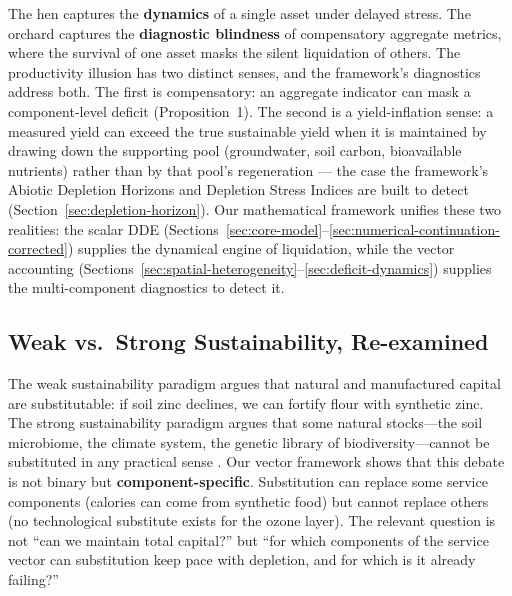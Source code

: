 \documentclass[twocolumn,10pt]{article}
\begin{document}
The hen captures the \textbf{dynamics} of a single asset under delayed stress. The orchard captures the \textbf{diagnostic blindness} of compensatory aggregate metrics, where the survival of one asset masks the silent liquidation of others. The productivity illusion has two distinct senses, and the framework's diagnostics address both. The first is compensatory: an aggregate indicator can mask a component-level deficit (Proposition~1). The second is a yield-inflation sense: a measured yield can exceed the true sustainable yield when it is maintained by drawing down the supporting pool (groundwater, soil carbon, bioavailable nutrients) rather than by that pool's regeneration --- the case the framework's Abiotic Depletion Horizons and Depletion Stress Indices are built to detect (Section~\ref{sec:depletion-horizon}). Our mathematical framework unifies these two realities: the scalar DDE (Sections~\ref{sec:core-model}--\ref{sec:numerical-continuation-corrected}) supplies the dynamical engine of liquidation, while the vector accounting (Sections~\ref{sec:spatial-heterogeneity}--\ref{sec:deficit-dynamics}) supplies the multi-component diagnostics to detect it.

\subsection{Weak vs.\ Strong Sustainability, Re-examined}
\label{sec:weak-vs-strong}
The weak sustainability paradigm argues that natural and manufactured capital are substitutable: if soil zinc declines, we can fortify flour with synthetic zinc. The strong sustainability paradigm argues that some natural stocks---the soil microbiome, the climate system, the genetic library of biodiversity---cannot be substituted in any practical sense \cite{daly1990}. Our vector framework shows that this debate is not binary but \textbf{component-specific}. Substitution can replace some service components (calories can come from synthetic food) but cannot replace others (no technological substitute exists for the ozone layer). The relevant question is not ``can we maintain total capital?'' but ``for which components of the service vector can substitution keep pace with depletion, and for which is it already failing?''
\end{document}
